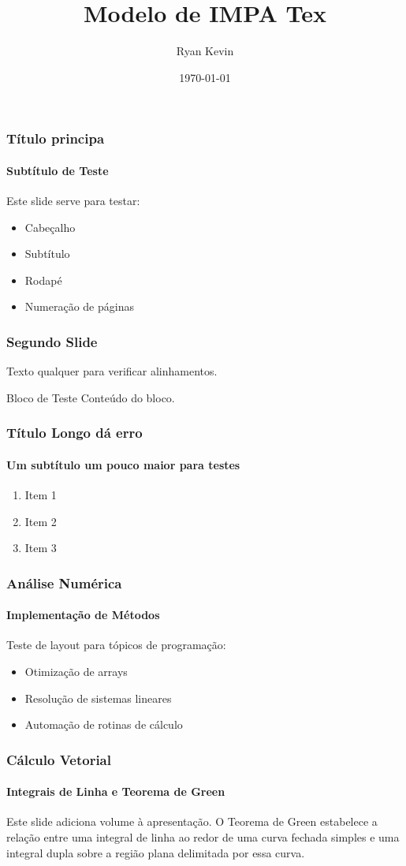 \documentclass[aspectratio=169]{beamer}
\title[IMPA Tex]{Modelo de IMPA Tex}
\author[Ryan Kevin]{Ryan Kevin}
\institute[IMPATECH]{Instituto de Matemática, Pesquisa e Tecnologia}
\date{\today}
\begin{document}
\begin{frame}
    \frametitle{Título principa}
    \framesubtitle{Subtítulo de Teste}

    Este slide serve para testar:

    \begin{itemize}
        \item Cabeçalho
        \item Subtítulo
        \item Rodapé
        \item Numeração de páginas
    \end{itemize}
\end{frame}

\begin{frame}
    \frametitle{Segundo Slide}

    Texto qualquer para verificar alinhamentos.

    \vspace{1cm}

    \begin{block}{Bloco de Teste}
        Conteúdo do bloco.
    \end{block}
\end{frame}

\begin{frame}
    \frametitle{Título Longo dá erro}
    \framesubtitle{Um subtítulo um pouco maior para testes}

    \begin{enumerate}
        \item Item 1
        \item Item 2
        \item Item 3
    \end{enumerate}
\end{frame}

\begin{frame}
    \frametitle{Análise Numérica}
    \framesubtitle{Implementação de Métodos}
    
    Teste de layout para tópicos de programação:
    \begin{itemize}
        \item Otimização de arrays
        \item Resolução de sistemas lineares
        \item Automação de rotinas de cálculo
    \end{itemize}
\end{frame}

\begin{frame}
    \frametitle{Cálculo Vetorial}
    \framesubtitle{Integrais de Linha e Teorema de Green}

    Este slide adiciona volume à apresentação. O Teorema de Green estabelece a relação entre uma integral de linha ao redor de uma curva fechada simples e uma integral dupla sobre a região plana delimitada por essa curva.
\end{frame}
\end{document}
